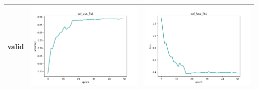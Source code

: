 \documentclass[a4paper, 12pt]{article}
\begin{document}
\begin{table}[!htb]
\begin{tabular}{|c|c|c|}
        valid &\includegraphics[scale=0.5]{p2/experiment/mynet_2024_04_14_21_58_22_sgd_pre_da/log/val_acc_list.png} & \includegraphics[scale=0.5]{p2/experiment/mynet_2024_04_14_21_58_22_sgd_pre_da/log/val_loss_list.png} \\
        \hline
    \end{tabular}
\end{table}
\end{document}
